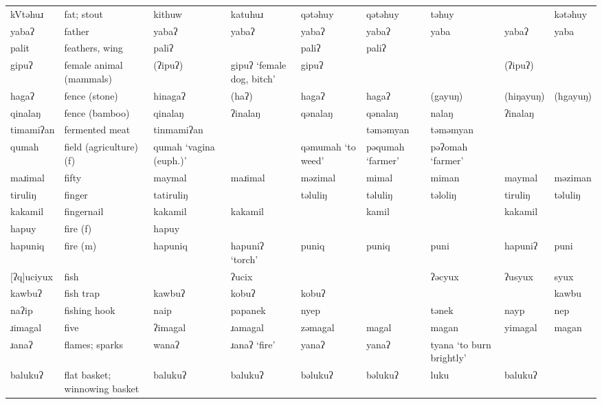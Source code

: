 \begin{landscape}
\begin{longtable}{*{9}{>{\raggedright\arraybackslash}p{}}}
\text{*}kVtəhuɹ      & fat; stout & kithuw & katuhuɹ & qətəhuy & qətəhuy & təhuy &  & kətəhuy\\
\text{*}yabaʔ        & father & yabaʔ & yabaʔ & yabaʔ & yabaʔ & yaba & yabaʔ & yaba\\
\text{*}palit        & feathers, wing & paliʔ &  & paliʔ & paliʔ &  &  & \\
\text{*}gipuʔ        & female animal (mammals) & (ʔipuʔ) & gipuʔ `female dog, bitch' & gipuʔ &  &  & (ʔipuʔ) & \\
\text{*}hagaʔ        & fence (stone) & hinagaʔ & (haʔ) & hagaʔ & hagaʔ & (gayuŋ) & (hiŋayuŋ) & (hgayuŋ)\\
\text{*}qinalaŋ      & fence (bamboo) & qinalaŋ & ʔinalaŋ & qənalaŋ & qənalaŋ & nalaŋ & ʔinalaŋ & \\
\text{*}timamiʔan    & fermented meat & tinmamiʔan &  &  & təməmyan & təməmyan &  & \\
\text{*}qumah        & field (agriculture) (f) & qumah `vagina (euph.)' &  & qəmumah \newline `to weed' & pəqumah `farmer' & pəʔomah `farmer' &  & \\
\text{*}maɹimal      & fifty & maymal & maɹimal & məzimal & mimal & miman & maymal & məziman\\
\text{*}tiruliŋ      & finger & tatiruliŋ &  & təluliŋ & təluliŋ & təloliŋ & tiruliŋ & təluliŋ\\
\text{*}kakamil      & fingernail & kakamil & kakamil &  & kamil &  & kakamil & \\
\text{*}hapuy        & fire (f) & hapuy &  &  &  &  &  & \\
\text{*}hapuniq      & fire (m) & hapuniq & hapuniʔ `torch' & puniq & puniq & puni & hapuniʔ & puni\\
\text{*}[ʔq]uciyux   & fish &  & ʔucix &  &  & ʔəcyux & ʔusyux & syux\\
\text{*}kawbuʔ       & fish trap & kawbuʔ & kobuʔ & kobuʔ &  &  &  & kawbu\\
\text{*}naʔip        & fishing hook & naip & papanek & nyep &  & tənek & nayp & nep\\
\text{*}ɹimagal      & five & ʔimagal & ɹamagal & zəmagal & magal & magan & yimagal & magan\\
\text{*}ɹanaʔ        & flames; sparks & wanaʔ & ɹanaʔ `fire' & yanaʔ & yanaʔ & tyana `to burn brightly' &  & \\
\text{*}balukuʔ      & flat basket; winnowing basket & balukuʔ & balukuʔ & bəlukuʔ & bəlukuʔ & luku & balukuʔ & \\

\end{longtable}
\end{landscape}
